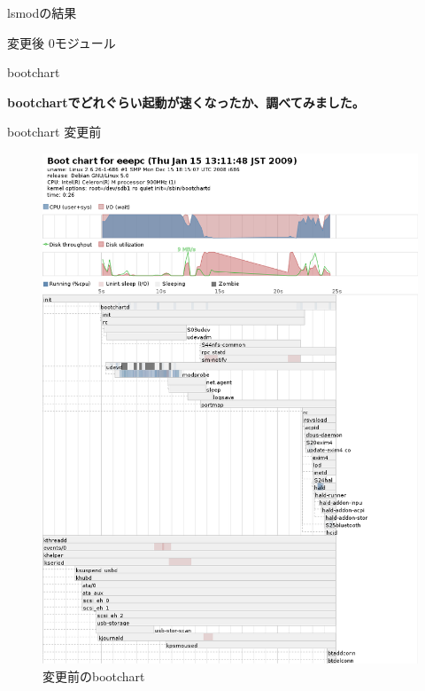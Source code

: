 \begin{frame}[containsverbatim]{lsmodの結果}

 変更後 0モジュール

\end{frame}

\begin{frame}{bootchart}

{\bf bootchartでどれぐらい起動が速くなったか、調べてみました。}

\end{frame}

\begin{frame}{bootchart 変更前}
\begin{figure}
 \begin{center}
 \includegraphics[scale=1.0]{image200901/bootchart-eeepc.png}
 \caption{変更前のbootchart}
 \label{fig:bootchart-eeepc}
 \end{center}
\end{figure}

\end{frame}

